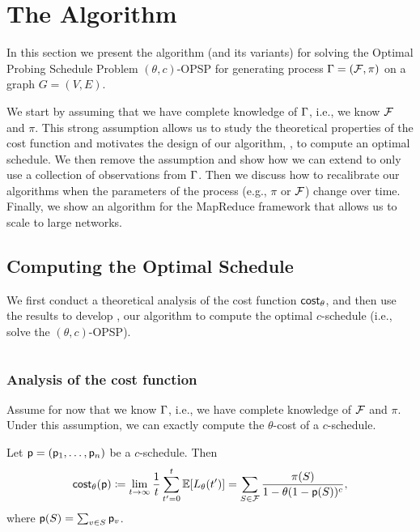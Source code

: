 \section{The \algonamebasecaps{} Algorithm}\label{sec:method}
In this section we present the algorithm \algoname
(and its variants) for solving
the Optimal Probing Schedule Problem $(\theta,c)$-OPSP for generating process
$\Gamma=(\mathcal{F},\pi)$ on a graph $G=(V,E)$.

We start by assuming that we have complete knowledge of $\Gamma$, i.e., we know
$\mathcal{F}$ and $\pi$. This strong assumption allows us to study the theoretical
properties of the cost function and motivates the design of our algorithm,
\algoname, to compute an optimal schedule. We then remove the assumption and show
how we can extend \algoname to only use a collection of observations from
$\Gamma$. Then we discuss how to recalibrate our algorithms when the parameters of
the process (e.g., $\pi$ or $\mathcal{F}$) change over time.  Finally, we show an
algorithm for the MapReduce framework that allows us to scale to large networks.

\subsection{Computing the Optimal Schedule}\label{sec:optimize}
We first conduct a theoretical analysis of the cost function $\mathsf{cost}_\theta$,
and then use the results to develop \algoname, our algorithm to compute the
optimal $c$-schedule (i.e., solve the $(\theta,c)$-OPSP).

$ $

\subsubsection{Analysis of the cost function}
Assume for now that we know $\Gamma$, i.e., we have complete knowledge of
$\mathcal{F}$ and $\pi$. Under this assumption, we can exactly compute the
$\theta$-cost of a $c$-schedule.

\begin{lemma}\label{lem:explicit}
Let $\mathsf{p}=(\mathsf{p}_1,\ldots,\mathsf{p}_n)$ be a $c$-schedule. Then
\begin{equation}\label{eq:explicit}
	\mathsf{cost}_\theta(\mathsf{p}) \coloneqq
	\lim_{t\rightarrow\infty}\frac{1}{t}\sum_{t'=0}^t\mathbb{E}[L_\theta(t')] =
	\sum_{S\in \mathcal{F}} \frac{\pi(S)}{1- \theta(1-\mathsf{p}(S))^c},
\end{equation}
where $\mathsf{p}(S) = \sum_{v\in S} \mathsf{p}_v$.
\end{lemma}

